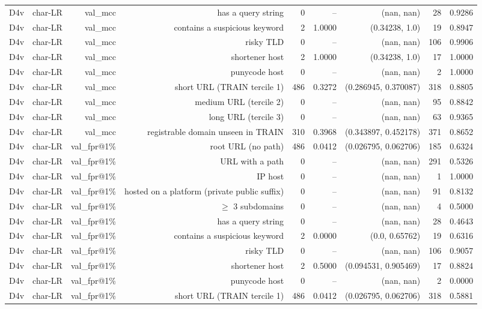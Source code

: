 \begin{table}[t]
\begin{tabular}{llrrrrrrr}
D4v & char-LR & val\_mcc & has a query string & 0 & -- & (nan, nan) & 28 & 0.9286 \\
D4v & char-LR & val\_mcc & contains a suspicious keyword & 2 & 1.0000 & (0.34238, 1.0) & 19 & 0.8947 \\
D4v & char-LR & val\_mcc & risky TLD & 0 & -- & (nan, nan) & 106 & 0.9906 \\
D4v & char-LR & val\_mcc & shortener host & 2 & 1.0000 & (0.34238, 1.0) & 17 & 1.0000 \\
D4v & char-LR & val\_mcc & punycode host & 0 & -- & (nan, nan) & 2 & 1.0000 \\
D4v & char-LR & val\_mcc & short URL (TRAIN tercile 1) & 486 & 0.3272 & (0.286945, 0.370087) & 318 & 0.8805 \\
D4v & char-LR & val\_mcc & medium URL (tercile 2) & 0 & -- & (nan, nan) & 95 & 0.8842 \\
D4v & char-LR & val\_mcc & long URL (tercile 3) & 0 & -- & (nan, nan) & 63 & 0.9365 \\
D4v & char-LR & val\_mcc & registrable domain unseen in TRAIN & 310 & 0.3968 & (0.343897, 0.452178) & 371 & 0.8652 \\
D4v & char-LR & val\_fpr@1\% & root URL (no path) & 486 & 0.0412 & (0.026795, 0.062706) & 185 & 0.6324 \\
D4v & char-LR & val\_fpr@1\% & URL with a path & 0 & -- & (nan, nan) & 291 & 0.5326 \\
D4v & char-LR & val\_fpr@1\% & IP host & 0 & -- & (nan, nan) & 1 & 1.0000 \\
D4v & char-LR & val\_fpr@1\% & hosted on a platform (private public suffix) & 0 & -- & (nan, nan) & 91 & 0.8132 \\
D4v & char-LR & val\_fpr@1\% & $\geq$ 3 subdomains & 0 & -- & (nan, nan) & 4 & 0.5000 \\
D4v & char-LR & val\_fpr@1\% & has a query string & 0 & -- & (nan, nan) & 28 & 0.4643 \\
D4v & char-LR & val\_fpr@1\% & contains a suspicious keyword & 2 & 0.0000 & (0.0, 0.65762) & 19 & 0.6316 \\
D4v & char-LR & val\_fpr@1\% & risky TLD & 0 & -- & (nan, nan) & 106 & 0.9057 \\
D4v & char-LR & val\_fpr@1\% & shortener host & 2 & 0.5000 & (0.094531, 0.905469) & 17 & 0.8824 \\
D4v & char-LR & val\_fpr@1\% & punycode host & 0 & -- & (nan, nan) & 2 & 0.0000 \\
D4v & char-LR & val\_fpr@1\% & short URL (TRAIN tercile 1) & 486 & 0.0412 & (0.026795, 0.062706) & 318 & 0.5881 \\

\end{tabular}
\end{table}
